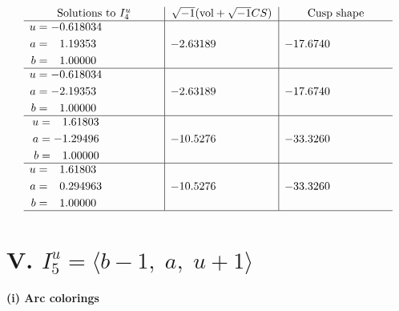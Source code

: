 \documentclass[1p]{elsarticle_modified}
\theoremstyle{definition}
\newcommand{\I}{\sqrt{-1}}
\begin{document}
$$\begin{array}{c|c|c}  
\text{Solutions to }I^u_{4}& \I (\text{vol} + \sqrt{-1}CS) & \text{Cusp shape}\\
 \hline 
\begin{aligned}
u &= -0.618034\phantom{ +0.000000I} \\
a &= \phantom{-}1.19353\phantom{ +0.000000I} \\
b &= \phantom{-}1.00000\phantom{ +0.000000I}\end{aligned}
 & -2.63189\phantom{ +0.000000I} & -17.6740\phantom{ +0.000000I} \\ \hline\begin{aligned}
u &= -0.618034\phantom{ +0.000000I} \\
a &= -2.19353\phantom{ +0.000000I} \\
b &= \phantom{-}1.00000\phantom{ +0.000000I}\end{aligned}
 & -2.63189\phantom{ +0.000000I} & -17.6740\phantom{ +0.000000I} \\ \hline\begin{aligned}
u &= \phantom{-}1.61803\phantom{ +0.000000I} \\
a &= -1.29496\phantom{ +0.000000I} \\
b &= \phantom{-}1.00000\phantom{ +0.000000I}\end{aligned}
 & -10.5276\phantom{ +0.000000I} & -33.3260\phantom{ +0.000000I} \\ \hline\begin{aligned}
u &= \phantom{-}1.61803\phantom{ +0.000000I} \\
a &= \phantom{-}0.294963\phantom{ +0.000000I} \\
b &= \phantom{-}1.00000\phantom{ +0.000000I}\end{aligned}
 & -10.5276\phantom{ +0.000000I} & -33.3260\phantom{ +0.000000I}\\
 \hline 
 \end{array}$$\newpage\newpage\renewcommand{\arraystretch}{1}
\centering \section*{V. $I^u_{5}= \langle b-1,\;a,\;u+1 \rangle$}
\flushleft \textbf{(i) Arc colorings}\\
\end{document}
